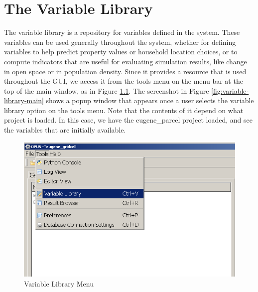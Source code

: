 \chapter{The Variable Library}

The variable library is a repository for variables defined in the system.  These variables can be used generally throughout the system, whether for defining variables to help predict property values or household location choices, or to compute indicators that are useful for evaluating simulation results, like change in open space or in population density.  Since it provides a resource that is used throughout the GUI, we access it from the tools menu on the menu bar at the top of the main window, as in Figure \ref{fig:variable-library-menu}.  The screenshot in Figure \ref{fig:variable-library-main} shows a popup window that appears once a user selects the variable library option on the tools menu.  Note that the contents of it depend on what project is loaded.  In this case, we have the eugene\_parcel project loaded, and see the variables that are initially available.  

\begin{figure}[htp]
\begin{center}
\includegraphics[scale=0.6]{part-gui/images/model-manager-variable-library-menu.png}
\end{center}
\caption{Variable Library Menu}
\label{fig:variable-library-menu}
\end{figure}

